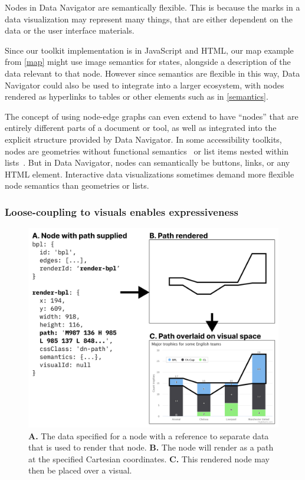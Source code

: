 \documentclass[journal]{vgtc}                %
\begin{document}
Nodes in Data Navigator are semantically flexible. This is because the marks in a data visualization may represent many things, that are either dependent on the data or the user interface materials.

Since our toolkit implementation is in JavaScript and HTML, our map example from \autoref{map} might use image semantics for states, alongside a description of the data relevant to that node. However since semantics are flexible in this way, Data Navigator could also be used to integrate into a larger ecosystem, with nodes rendered as hyperlinks to tables or other elements such as in \autoref{semantics}.

The concept of using node-edge graphs can even extend to have ``nodes'' that are entirely different parts of a document or tool, as well as integrated into the explicit structure provided by Data Navigator. In some accessibility toolkits, nodes are geometries without functional semantics~\cite{Satyanarayan2017VegaLite} or list items nested within lists~\cite{Blanco2022olli}. But in Data Navigator, nodes can semantically be buttons, links, or any HTML element. Interactive data visualizations sometimes demand more flexible node semantics than geometries or lists.

\subsubsection{Loose-coupling to visuals enables expressiveness}

\begin{figure}[h]
  \centering
  \includegraphics[width=\linewidth]{figures/path.png}
  \caption{\textbf{A.} The data specified for a node with a reference to separate data that is used to render that node. \textbf{B.} The node will render as a path at the specified Cartesian coordinates. \textbf{C.} This rendered node may then be placed over a visual.}
  \label{path}
\end{figure}
\end{document}
